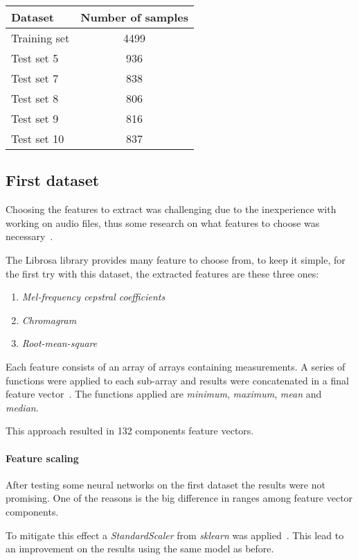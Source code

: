 \begin{center}
    \begin{tabular}{ |l|c| } 
        \hline
        Dataset & Number of samples \\
        \hline
        Training set & 4499 \\
        Test set 5 & 936 \\
        Test set 7 & 838 \\
        Test set 8 & 806 \\
        Test set 9 & 816 \\
        Test set 10 & 837 \\
        \hline
    \end{tabular}
\end{center}

\subsection{First dataset}
Choosing the features to extract was challenging due to the inexperience
with working on audio files, thus some research on what features to 
choose was necessary~\cite{features}.  

The Librosa library provides many feature to choose from,
to keep it simple, for the first try with this dataset, the extracted features 
are these three ones: 
\begin{enumerate}
    \item \emph{Mel-frequency cepstral coefficients}
    \item \emph{Chromagram}
    \item \emph{Root-mean-square}
\end{enumerate}
Each feature consists of an array of arrays containing measurements. 
A series of functions were applied to each sub-array and results 
were concatenated in a final feature vector~\cite{librosa-first}. 
The functions applied are \emph{minimum}, \emph{maximum}, \emph{mean} 
and \emph{median}.

This approach resulted in 132 components feature vectors.

\paragraph{Feature scaling}
After testing some neural networks on the first dataset the results 
were not promising. One of the reasons is the big difference in 
ranges among feature vector components.

To mitigate this effect a \emph{StandardScaler} from \emph{sklearn} was applied~\cite{scaler}\cite{scikitlearn}.
This lead to an improvement on the results using the same 
model as before. 

